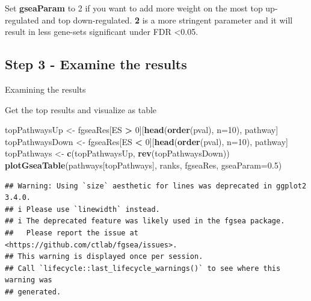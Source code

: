 \documentclass[
]{book}
\newenvironment{Shaded}{\begin{snugshade}}{\end{snugshade}}
\newcommand{\AttributeTok}[1]{\textcolor[rgb]{0.13,0.29,0.53}{#1}}
\newcommand{\DecValTok}[1]{\textcolor[rgb]{0.00,0.00,0.81}{#1}}
\newcommand{\FloatTok}[1]{\textcolor[rgb]{0.00,0.00,0.81}{#1}}
\newcommand{\FunctionTok}[1]{\textcolor[rgb]{0.13,0.29,0.53}{\textbf{#1}}}
\newcommand{\NormalTok}[1]{#1}
\newcommand{\OtherTok}[1]{\textcolor[rgb]{0.56,0.35,0.01}{#1}}
\newcommand{\SpecialCharTok}[1]{\textcolor[rgb]{0.81,0.36,0.00}{\textbf{#1}}}
\newenvironment{rmd-tip}{\begin{tcolorbox}[colback=green!5,colframe=green!50!black,title=Tip]}{\end{tcolorbox}}
\begin{document}
\begin{Shaded}
\end{Shaded}

\begin{rmd-tip}
Set \textbf{gseaParam} to 2 if you want to add more weight on the most
top up-regulated and top down-regulated. \textbf{2} is a more stringent
parameter and it will result in less gene-sets significant under FDR
\textless0.05.
\end{rmd-tip}

\subsection{Step 3 - Examine the results}\label{step-3---examine-the-results}

Examining the results

Get the top results and visualize as table

\begin{Shaded}
\begin{Highlighting}[]
\NormalTok{topPathwaysUp }\OtherTok{\textless{}{-}}\NormalTok{ fgseaRes[ES }\SpecialCharTok{\textgreater{}} \DecValTok{0}\NormalTok{][}\FunctionTok{head}\NormalTok{(}\FunctionTok{order}\NormalTok{(pval), }\AttributeTok{n=}\DecValTok{10}\NormalTok{), pathway]}
\NormalTok{topPathwaysDown }\OtherTok{\textless{}{-}}\NormalTok{ fgseaRes[ES }\SpecialCharTok{\textless{}} \DecValTok{0}\NormalTok{][}\FunctionTok{head}\NormalTok{(}\FunctionTok{order}\NormalTok{(pval), }\AttributeTok{n=}\DecValTok{10}\NormalTok{), pathway]}
\NormalTok{topPathways }\OtherTok{\textless{}{-}} \FunctionTok{c}\NormalTok{(topPathwaysUp, }\FunctionTok{rev}\NormalTok{(topPathwaysDown))}
\FunctionTok{plotGseaTable}\NormalTok{(pathways[topPathways], ranks, fgseaRes, }\AttributeTok{gseaParam=}\FloatTok{0.5}\NormalTok{)}
\end{Highlighting}
\end{Shaded}

\begin{verbatim}
## Warning: Using `size` aesthetic for lines was deprecated in ggplot2 3.4.0.
## i Please use `linewidth` instead.
## i The deprecated feature was likely used in the fgsea package.
##   Please report the issue at <https://github.com/ctlab/fgsea/issues>.
## This warning is displayed once per session.
## Call `lifecycle::last_lifecycle_warnings()` to see where this warning was
## generated.
\end{verbatim}
\end{document}
